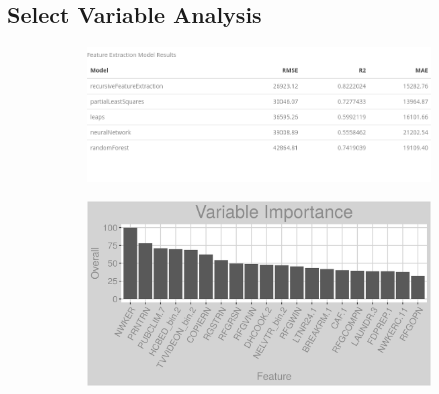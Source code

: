 \subsection{Select Variable Analysis}
\label{appendix:district_heat:sva}
\begin{figure}[h]
\centering
\begin{subfigure}{0.8\textwidth}
\centering
\includegraphics[width=.99\textwidth, height=0.35\textheight]{Images/district_heat_fe_summary.png}
\end{subfigure}
\begin{subfigure}{1\textwidth}
\centering
\includegraphics[width=.99\textwidth, height=0.35\textheight]{Images/district_heat_all_vars.png}
\end{subfigure}
\end{figure}
\FloatBarrier
\newpage
